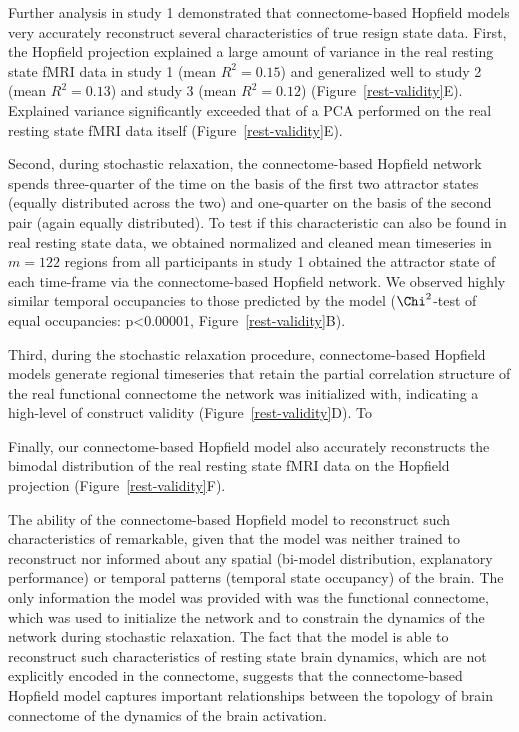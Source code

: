 \documentclass{article}
\begin{document}
Further analysis in study 1 demonstrated that connectome-based Hopfield models very accurately reconstruct several characteristics of true resign state data.
First, the Hopfield projection explained a large amount of variance in the real resting state fMRI data in study 1 (mean $R^2=0.15$) and generalized well to study 2 (mean $R^2=0.13$) and study 3 (mean $R^2=0.12$) (Figure~\ref{rest-validity}E). Explained variance significantly exceeded that of a PCA performed on the real resting state fMRI data itself (Figure~\ref{rest-validity}E).

Second, during stochastic relaxation, the connectome-based Hopfield network spends three-quarter of the time on the basis of the first two attractor states (equally distributed across the two) and one-quarter on the basis of the second pair (again equally distributed). To test if this characteristic can also be found in real resting state data, we obtained normalized and cleaned mean timeseries in $m=122$ regions from all participants in study 1 obtained the attractor state of each time-frame via the connectome-based Hopfield network. We observed highly similar temporal occupancies to those predicted by the model ($\Chi^2$-test of equal occupancies: p\textless 0.00001, Figure~\ref{rest-validity}B).

Third, during the stochastic relaxation procedure, connectome-based Hopfield models generate regional timeseries that retain the partial correlation structure of the real functional connectome the network was initialized with, indicating a high-level of construct validity (Figure~\ref{rest-validity}D). To

Finally, our connectome-based Hopfield model also accurately reconstructs the bimodal distribution of the real resting state fMRI data on the Hopfield projection (Figure~\ref{rest-validity}F).

The ability of the connectome-based Hopfield model to reconstruct such characteristics of remarkable, given that the model was neither trained to reconstruct nor informed about any spatial (bi-model distribution, explanatory performance) or temporal patterns (temporal state occupancy) of the brain. The only information the model was provided with was the functional connectome, which was used to initialize the network and to constrain the dynamics of the network during stochastic relaxation. The fact that the model is able to reconstruct such characteristics of resting state brain dynamics, which are not explicitly encoded in the connectome, suggests that the connectome-based Hopfield model captures important relationships between the topology of brain connectome of the dynamics of the brain activation.
\end{document}
